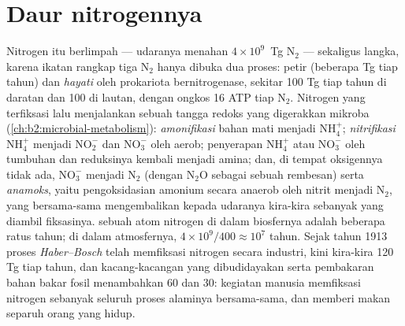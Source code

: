 \section{Daur nitrogennya}

\begin{proposition}\label{prop:b2:biogeochemical-cycles:nitrogen}
%
Nitrogen itu berlimpah --- udaranya menahan $4\times 10^{9}$~Tg
$\mathrm{N_2}$ --- sekaligus langka, karena ikatan rangkap tiga
$\mathrm{N_2}$ hanya dibuka dua proses: petir (beberapa Tg tiap tahun)
dan \emph{ hayati} oleh prokariota bernitrogenase,
sekitar 100 Tg tiap tahun di daratan dan 100 di lautan, dengan ongkos
16 ATP tiap $\mathrm{N_2}$. Nitrogen yang terfiksasi lalu menjalankan
sebuah tangga redoks yang digerakkan mikroba
(\cref{ch:b2:microbial-metabolism}): \emph{amonifikasi} bahan mati
menjadi $\mathrm{NH_4^{+}}$; \emph{nitrifikasi} $\mathrm{NH_4^{+}}$
menjadi $\mathrm{NO_2^{-}}$ dan $\mathrm{NO_3^{-}}$ oleh 
aerob; penyerapan $\mathrm{NH_4^{+}}$ atau $\mathrm{NO_3^{-}}$ oleh
tumbuhan dan reduksinya kembali menjadi amina; dan, di tempat oksigennya
tidak ada, \emph{} $\mathrm{NO_3^{-}}$ menjadi
$\mathrm{N_2}$ (dengan $\mathrm{N_2O}$ sebagai sebuah rembesan) serta
\emph{anamoks}, yaitu pengoksidasian amonium secara anaerob oleh nitrit
menjadi $\mathrm{N_2}$, yang bersama-sama mengembalikan kepada udaranya
kira-kira sebanyak yang diambil fiksasinya.  sebuah atom
nitrogen di dalam biosfernya adalah beberapa ratus tahun; di dalam
atmosfernya, $4\times
10^{9}/400 \approx 10^{7}$ tahun. Sejak tahun
1913 proses \emph{Haber--Bosch} telah memfiksasi nitrogen secara
industri, kini kira-kira 120 Tg tiap tahun, dan kacang-kacangan yang
dibudidayakan serta pembakaran bahan bakar fosil menambahkan 60 dan 30:
kegiatan manusia memfiksasi nitrogen sebanyak seluruh proses alaminya
bersama-sama, dan memberi makan separuh orang yang hidup.
\end{proposition}

